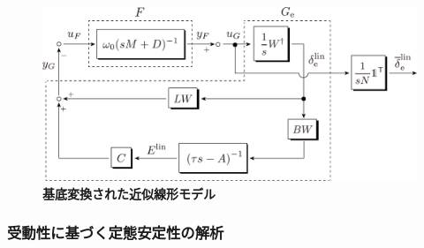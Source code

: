 \documentclass[tombow,dvipdfmx]{corona-a5-1.1}
\begin{document}
\begin{figure}[t]
\centering
\includegraphics[width = .90\linewidth]{figs/FandGe2}
\medskip
\caption{\textbf{基底変換された近似線形モデル}}
\label{fig:GandGe}
\medskip
\end{figure}


\smallskip
\subsubsection{受動性に基づく定態安定性の解析}
\end{document}
